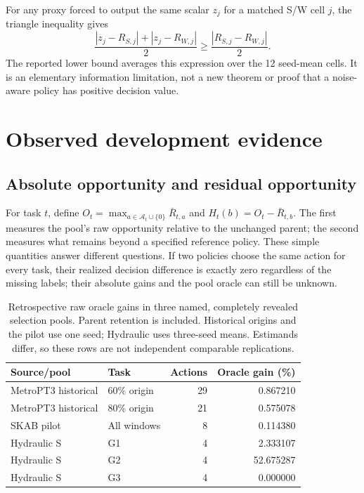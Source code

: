 \documentclass[11pt]{article}
\begin{document}
For any proxy forced to output the same scalar $z_j$ for a matched S/W cell $j$, the triangle inequality gives
\begin{equation}
 \frac{|z_j-R_{S,j}|+|z_j-R_{W,j}|}{2}
 \geq \frac{|R_{S,j}-R_{W,j}|}{2}.
\end{equation}
The reported lower bound averages this expression over the 12 seed-mean cells. It is an elementary information limitation, not a new theorem or proof that a noise-aware policy has positive decision value.

\section{Observed development evidence}
\subsection{Absolute opportunity and residual opportunity}
For task $t$, define $O_t=\max_{a\in\mathcal A_t\cup\{0\}}\bar R_{t,a}$ and $H_t(b)=O_t-\bar R_{t,b}$. The first measures the pool's raw opportunity relative to the unchanged parent; the second measures what remains beyond a specified reference policy. These simple quantities answer different questions. If two policies choose the same action for every task, their realized decision difference is exactly zero regardless of the missing labels; their absolute gains and the pool oracle can still be unknown.

\begin{table}[ht]
\centering\small
\caption{Retrospective raw oracle gains in three named, completely revealed selection pools. Parent retention is included. Historical origins and the pilot use one seed; Hydraulic uses three-seed means. Estimands differ, so these rows are not independent comparable replications.}
\label{tab:headroom}
\begin{tabular}{llrr}\toprule
Source/pool & Task & Actions & Oracle gain (\%)\\\midrule
MetroPT3 historical & 60\% origin & 29 & 0.867210\\
MetroPT3 historical & 80\% origin & 21 & 0.575078\\
SKAB pilot & All windows & 8 & 0.114380\\
Hydraulic S & G1 & 4 & 2.333107\\
Hydraulic S & G2 & 4 & 52.675287\\
Hydraulic S & G3 & 4 & 0.000000\\\bottomrule
\end{tabular}
\end{table}
\end{document}
